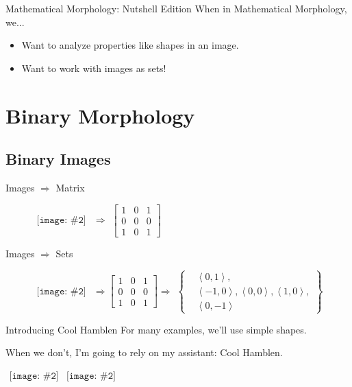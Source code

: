 \documentclass{beamer}
\newcommand{\pic}[2]{
     \begin{array}{l}
      \texttt{[image: \#2]}
      \end{array}
}
\newcommand{\set}[1]{\left\lbrace #1 \right\rbrace}
\newcommand{\tuple}[1]{\left\langle #1 \right\rangle}
\begin{document}
\begin{frame}{Mathematical Morphology: Nutshell Edition}
  When in Mathematical Morphology, we...
  \begin{itemize}
    \item Want to analyze properties like shapes in an image.
    \item Want to work with images as sets!
  \end{itemize} 
\end{frame}

\section{Binary Morphology}

\subsection{Binary Images}
\begin{frame}{Images $\Rightarrow$ Matrix}
\begin{figure}
\centering
$\pic{width=50pt}{images/cross.png}$
$\Rightarrow$
$\begin{bmatrix}
  1 & 0 & 1\\
  0 & 0 & 0\\
  1 & 0 & 1
\end{bmatrix}$
\end{figure}
\end{frame}

\begin{frame}{Images $\Rightarrow$ Sets}
\begin{figure}
\centering
$\pic{width=50pt}{images/cross.png}  $
$\Rightarrow
\begin{bmatrix}
  1 & 0 & 1\\
  0 & 0 & 0\\
  1 & 0 & 1
\end{bmatrix}
\Rightarrow$
$\set{\begin{aligned}
      &\tuple{0,1},\\
      &\tuple{-1,0},\tuple{0,0},\tuple{1,0},\\
      &\tuple{0,-1}
      \end{aligned}}$
\end{figure}
\end{frame}

\begin{frame}{Introducing Cool Hamblen}
For many examples, we'll use simple shapes.

When we don't, I'm going to rely on my assistant: Cool Hamblen.

$\pic{width=100pt}{./images/coolhamblen.png}
\pic{width=100pt}{./images/binarycoolhamblen.png}$
\end{frame}
\end{document}
